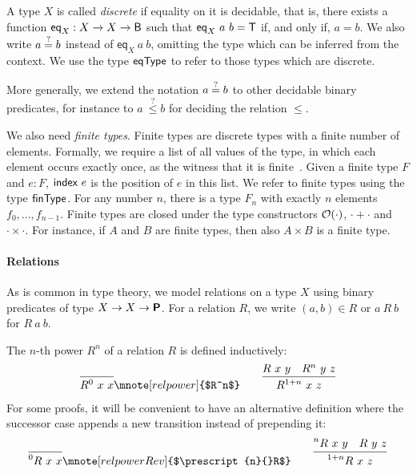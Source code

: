 A type $X$ is called \textit{discrete} if equality on it is decidable, that is, there exists a function $\textsf{eq}_X : X \rightarrow X \rightarrow \textsf{B}$ such that $\textsf{eq}_X~a~b = \mathsf{T}$ if, and only if, $a = b$. We also write $a\overset{?}{=}b$ instead of $\textsf{eq}_X~a~b$, omitting the type which can be inferred from the context. We use the type $\textsf{eqType}$ to refer to those types which are discrete.

More generally, we extend the notation $a\overset{?}{=}b$ to other decidable binary predicates, for instance to $a~\overset{?}{\le} b$ for deciding the relation $\le$.

We also need \textit{finite types}. Finite types are discrete types with a finite number of elements. Formally, we require a list of all values of the type, in which each element occurs exactly once, as the witness that it is finite~\cite{menz2016}. Given a finite type $F$ and $e : F$, $\textsf{index}~e$ is the position of $e$ in this list. We refer to finite types using the type $\textsf{finType}{}$.
For any number $n$, there is a type $F_n$ with exactly $n$ elements $f_0, \ldots, f_{n-1}$.
Finite types are closed under the type constructors $\mathcal{O}{(\cdot)}$, $\cdot + \cdot$ and $\cdot \times \cdot$. For instance, if $A$ and $B$ are finite types, then also $A \times B$ is a finite type.

\paragraph{Relations}
As is common in type theory, we model relations on a type $X$ using binary predicates of type $X \rightarrow X \rightarrow \textsf{\bfseries P}$. 
For a relation $R$, we write $(a, b) \in R$ or $a~R~b$ for $R~a~b$. 

The $n$-th power $R^n$ of a relation $R$ is defined inductively:
\begin{align*}
  \infer{R^0~x~x}{}\mnote[relpower]{$R^n$}
  \qquad
  \infer{R^{\natS{n}}~x~z}{R~x~y\quad R^n~y~z}
\end{align*}
For some proofs, it will be convenient to have an alternative definition where the successor case appends a new transition instead of prepending it:
\begin{align*}
  \infer{\prescript{0}{}R~x~x}{}\mnote[relpowerRev]{$\prescript{n}{}R$}
  \qquad
  \infer{\prescript{\natS{n}}{}R~x~z}{\prescript{n}{}R~x~y\quad R~y~z}
\end{align*}

